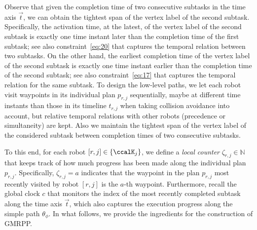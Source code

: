 \documentclass[Afour,sageh,times]{sagej}
\newcommand{\auto}[1]{\ccalA_{\textup{#1}}}
\newcommand{\autop}{\ccalA_{\phi}}
\newcommand{\domanda}[1]{\subsubsection*{#1}}
\begin{document}
{{ {Observe that given the completion time of two consecutive subtasks in the time axis $\vec{t}$, we can obtain the tightest span of the vertex label of the second subtask. Specifically, the activation time, at the latest, of the vertex label of the second subtask is exactly one time instant later than the completion time of the first subtask; see also constraint~\eqref{eq:20} that captures the temporal relation between two subtasks. On the other hand, the earliest completion time of the vertex label of the second subtask is exactly one time instant earlier than the completion time of the second subtask; see also constraint~\eqref{eq:17} that captures the temporal relation for the same subtask.  To design the low-level paths,  we let each robot visit waypoints in its individual plan $p_{r,j}$ sequentially, maybe at different time instants than those in its timeline $t_{r,j}$ when taking collision avoidance into account, but relative temporal relations with other robots (precedence or simultaneity) are kept. Also we maintain the tightest span of the vertex label of the considered subtask between completion times of two consecutive subtasks.}

 To this end, for each robot $[r,j] \in \{\ccalK_j\}$, we define a {\it local counter} $\zeta_{r,j} \in \mathbb{N}$  that  keeps track of how much progress has been made along the individual plan $p_{r,j}$. Specifically, $\zeta_{r,j} = a$ indicates that the waypoint in the plan $p_{r,j}$ most recently visited by  robot $[r,j]$ is the $a$-th waypoint. Furthermore, recall the  global clock $c$ that monitors the index of the most recently completed subtask  along the time axis $\vec{t}$, which also captures the execution progress along the simple path  $\theta_\phi$. In what follows, we provide the ingredients for the construction of GMRPP.


}}
\end{document}
